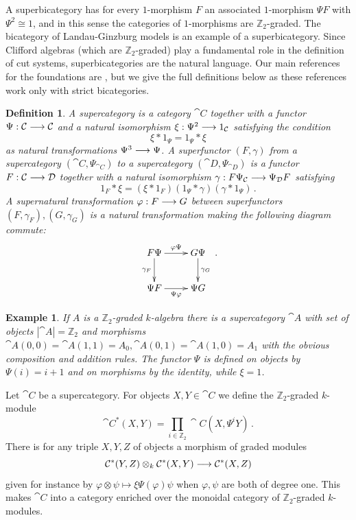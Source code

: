 \documentclass[english,letter paper,12pt,leqno]{article}
\theoremstyle{example}
\newtheorem{definition}[theorem]{Definition}
\newtheorem{example}[theorem]{Example}
\numberwithin{equation}{section}
\begin{document}
A superbicategory has for every $1$-morphism $F$ an associated $1$-morphism $\Psi F$ with $\Psi^2 \cong 1$, and in this sense the categories of $1$-morphisms are $\mathbb{Z}_2$-graded. The bicategory of Landau-Ginzburg models is an example of a superbicategory. Since Clifford algebras (which are $\mathbb{Z}_2$-graded) play a fundamental role in the definition of cut systems, superbicategories are the natural language. Our main references for the foundations are \cite{ellis_lauda,kang,kang2}, but we give the full definitions below as these references work only with strict bicategories.

\begin{definition} A \emph{supercategory} is a category $\cat{C}$ together with a functor $\Psi: \mathcal{C} \longrightarrow \mathcal{C}$ and a natural isomorphism $\xi: \Psi^2 \longrightarrow 1_{\mathcal{C}}$ satisfying the condition
\[
\xi * 1_{\Psi} = 1_{\Psi} * \xi
\]
as natural transformations $\Psi^3 \longrightarrow \Psi$. A \emph{superfunctor} $(F, \gamma)$ from a supercategory $(\cat{C}, \Psi_{\cat{C}})$ to a supercategory $(\cat{D}, \Psi_{\cat{D}})$ is a functor $F: \mathcal{C} \longrightarrow \mathcal{D}$ together with a natural isomorphism $\gamma: F \Psi_{\mathcal{C}} \longrightarrow \Psi_{\mathcal{D}} F$ satisfying
\[
1_F * \xi = (\xi * 1_F ) ( 1_{\Psi} * \gamma ) ( \gamma * 1_{\Psi} )\,.
\]
A \emph{supernatural transformation} $\varphi: F \longrightarrow G$ between superfunctors $(F,\gamma_F), (G,\gamma_G)$ is a natural transformation making the following diagram commute:
\[
\xymatrix{
F \Psi \ar[r]^-{\varphi \Psi}\ar[d]_-{\gamma_F} & G \Psi \ar[d]^-{\gamma_G}\\
\Psi F \ar[r]_-{\Psi \varphi} & \Psi G
}\,.
\] 
\end{definition}

\begin{example}\label{example:Aassup} If $A$ is a $\mathbb{Z}_2$-graded $k$-algebra there is a supercategory $\cat{A}$ with set of objects $|\cat{A}| = \mathbb{Z}_2$ and morphisms $\cat{A}(0,0) = \cat{A}(1,1) = A_0, \cat{A}(0,1) = \cat{A}(1,0) = A_1$ with the obvious composition and addition rules. The functor $\Psi$ is defined on objects by $\Psi(i) = i+1$ and on morphisms by the identity, while $\xi = 1$.
\end{example}

Let $\cat{C}$ be a supercategory. For objects $X,Y \in \cat{C}$ we define the $\mathbb{Z}_2$-graded $k$-module
\[
\cat{C}^*(X,Y) = \prod_{i \in \mathbb{Z}_2} \cat{C}(X, \Psi^i Y)\,.
\]
There is for any triple $X,Y,Z$ of objects a morphism of graded modules
\[
\mathcal{C}^*(Y,Z) \otimes_k \mathcal{C}^*(X, Y) \longrightarrow \mathcal{C}^*(X,Z)
\]
given for instance by $\varphi \otimes \psi \mapsto \xi \Psi( \varphi ) \psi$ when $\varphi, \psi$ are both of degree one. This makes $\cat{C}$ into a category enriched over the monoidal category of $\mathbb{Z}_2$-graded $k$-modules.
\end{document}

